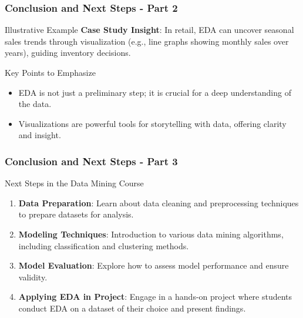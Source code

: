 \documentclass[aspectratio=169]{beamer}
\begin{document}
\begin{frame}[fragile]
    \frametitle{Conclusion and Next Steps - Part 2}
    
    \begin{block}{Illustrative Example}
        \textbf{Case Study Insight}:
        In retail, EDA can uncover seasonal sales trends through visualization (e.g., line graphs showing monthly sales over years), guiding inventory decisions.
    \end{block}
    
    \begin{block}{Key Points to Emphasize}
        \begin{itemize}
            \item EDA is not just a preliminary step; it is crucial for a deep understanding of the data.
            \item Visualizations are powerful tools for storytelling with data, offering clarity and insight.
        \end{itemize}
    \end{block}
\end{frame}

\begin{frame}[fragile]
    \frametitle{Conclusion and Next Steps - Part 3}
    
    \begin{block}{Next Steps in the Data Mining Course}
        \begin{enumerate}
            \item \textbf{Data Preparation}: Learn about data cleaning and preprocessing techniques to prepare datasets for analysis.
            \item \textbf{Modeling Techniques}: Introduction to various data mining algorithms, including classification and clustering methods.
            \item \textbf{Model Evaluation}: Explore how to assess model performance and ensure validity.
            \item \textbf{Applying EDA in Project}: Engage in a hands-on project where students conduct EDA on a dataset of their choice and present findings.
        \end{enumerate}
    \end{block}
\end{frame}
\end{document}
